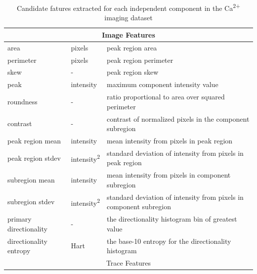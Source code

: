 \documentclass[10pt]{article}
\newcommand{\calcium}[0]{Ca\textsuperscript{2+}}
\begin{document}
\begin{table}[h]
  \centering
  \scriptsize
  \caption{Candidate fatures extracted for each independent component in the {\calcium} imaging dataset}
  \label{table:allfeatures}
  \begin{tabular}{lll}
    \toprule
    \multicolumn{3}{c}{Image Features} \\
    \midrule

    area & pixels & peak region area  \\
    \addlinespace[2pt]
    perimeter & pixels & peak region perimeter \\
    \addlinespace[2pt]
    skew & - & peak region skew \\
    \addlinespace[2pt]
    peak & intensity &  maximum component intensity value  \\
    \addlinespace[2pt]
    roundness & - &  ratio proportional to area over squared perimeter\\
    \addlinespace[2pt]
    contrast & - &  contrast of normalized pixels in the component subregion \\
    \addlinespace[2pt]
    peak region mean & intensity &  mean intensity from pixels in peak region \\
    \addlinespace[2pt]
    peak region stdev & intensity\textsuperscript{2} & standard deviation of intensity from pixels in peak region \\
    \addlinespace[2pt]
    subregion mean & intensity &  mean intensity from pixels in component subregion \\
    \addlinespace[2pt]
    subregion stdev & intensity\textsuperscript{2} &  standard deviation of intensity from pixels in component subregion \\
    \addlinespace[2pt]
    primary directionality & - &  the directionality histogram bin of greatest value \\
    \addlinespace[2pt]
    directionality entropy & Hart &  the base-\num{10} entropy for the directionality histogram \\
    
    \midrule
    \multicolumn{3}{c}{Trace Features} \\
    \midrule


\end{tabular}
\end{table}
\end{document}
